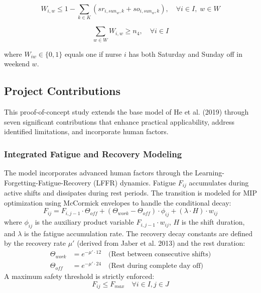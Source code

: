 \documentclass[10pt,a4paper,twocolumn]{article}
\begin{document}
\begin{equation}
W_{i,w} \leq 1 - \sum_{k \in K} \left( sr_{i,sun_w,k} + so_{i,sun_w,k} \right),
\quad \forall i \in I, \; w \in W
\end{equation}

\begin{equation}
\sum_{w \in W} W_{i,w} \geq n_4,
\quad \forall i \in I
\end{equation}

where $W_{iw} \in \{0,1\}$ equals one if nurse $i$ has both Saturday and Sunday off in weekend $w$.

\subsection{Project Contributions}

This proof-of-concept study extends the base model of He et al. (2019) through seven significant contributions that enhance practical applicability, address identified limitations, and incorporate human factors.

\subsubsection{Integrated Fatigue and Recovery Modeling} 

The model incorporates advanced human factors through the Learning-Forgetting-Fatigue-Recovery (LFFR) dynamics. Fatigue $F_{ij}$ accumulates during active shifts and dissipates during rest periods. The transition is modeled for MIP optimization using McCormick envelopes to handle the conditional decay:
\begin{equation}
F_{ij} = F_{i,j-1} \cdot \Theta_{off} + ( \Theta_{work} - \Theta_{off} ) \cdot \phi_{ij} + (\lambda \cdot H) \cdot w_{ij}
\end{equation}
where $\phi_{ij}$ is the auxiliary product variable $F_{i,j-1} \cdot w_{ij}$, $H$ is the shift duration, and $\lambda$ is the fatigue accumulation rate. The recovery decay constants are defined by the recovery rate $\mu'$ (derived from Jaber et al. 2013) and the rest duration:
\begin{align}
\Theta_{work} &= e^{-\mu' \cdot 12} \quad \text{(Rest between consecutive shifts)} \\
\Theta_{off} &= e^{-\mu' \cdot 24} \quad \text{(Rest during complete day off)}
\end{align}
A maximum safety threshold is strictly enforced:
\begin{equation}
F_{ij} \leq F_{max} \quad \forall i \in I, j \in J
\end{equation}
\end{document}
